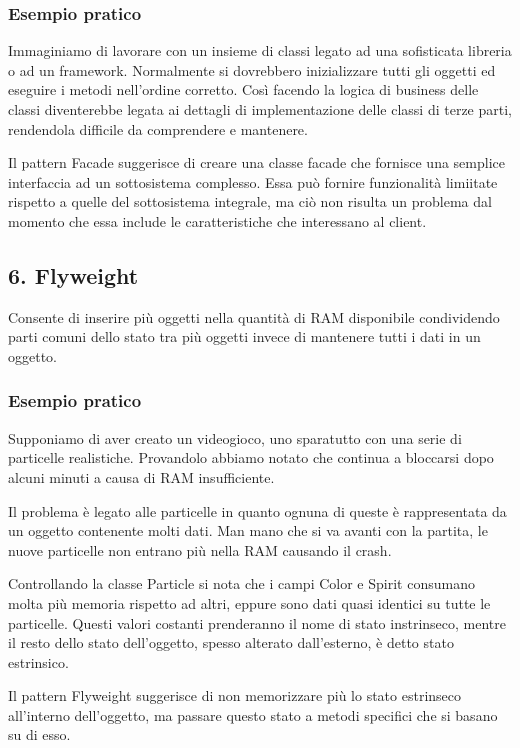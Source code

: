 \documentclass{report}
\begin{document}
\subsubsection*{Esempio pratico}
Immaginiamo di lavorare con un insieme di classi legato ad una sofisticata libreria o ad un framework. Normalmente si dovrebbero inizializzare tutti gli oggetti ed eseguire i metodi nell'ordine corretto. Così facendo la logica di business delle classi diventerebbe legata ai dettagli di implementazione delle classi di terze parti, rendendola difficile da comprendere e mantenere.

\medskip
\noindent
Il pattern Facade suggerisce di creare una classe facade che fornisce una semplice interfaccia ad un sottosistema complesso. Essa può fornire funzionalità limiitate rispetto a quelle del sottosistema integrale, ma ciò non risulta un problema dal momento che essa include le caratteristiche che interessano al client.

\subsection*{6. Flyweight}
Consente di inserire più oggetti nella quantità di RAM disponibile condividendo parti comuni dello stato tra più oggetti invece di mantenere tutti i dati in un oggetto.

\subsubsection*{Esempio pratico}
Supponiamo di aver creato un videogioco, uno sparatutto con una serie di particelle realistiche. Provandolo abbiamo notato che continua a bloccarsi dopo alcuni minuti a causa di RAM insufficiente.

\noindent
Il problema è legato alle particelle in quanto ognuna di queste è rappresentata da un oggetto contenente molti dati. Man mano che si va avanti con la partita, le nuove particelle non entrano più nella RAM causando il crash.

\medskip
\noindent
Controllando la classe Particle si nota che i campi Color e Spirit consumano molta più memoria rispetto ad altri, eppure sono dati quasi identici su tutte le particelle. Questi valori costanti prenderanno il nome di stato instrinseco, mentre il resto dello stato dell'oggetto, spesso alterato dall'esterno, è detto stato estrinsico.

\smallskip
\noindent
Il pattern Flyweight suggerisce di non memorizzare più lo stato estrinseco all'interno dell'oggetto, ma passare questo stato a metodi specifici che si basano su di esso.
\end{document}
